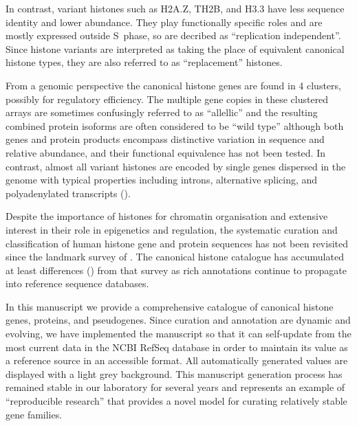   In contrast, variant histones such as H2A.Z, TH2B, and H3.3 have
  less sequence identity and lower abundance.
  They play functionally specific roles and are mostly expressed outside S~phase,
  so are decribed as ``replication independent''.
  Since histone variants are interpreted as taking the place of equivalent canonical histone types,
  they are also referred to as ``replacement'' histones.

  From a genomic perspective the canonical histone genes are found in 4 clusters,
  possibly for regulatory efficiency.
  The multiple gene copies in these clustered arrays are sometimes confusingly referred to as ``allellic''
  and the resulting combined protein isoforms are often considered to be ``wild type''
  although both genes and protein products encompass distinctive variation in sequence and relative abundance,
  and their functional equivalence has not been tested.
  In contrast, almost all variant histones are encoded by single genes dispersed in the genome
  with typical properties including introns, alternative splicing,
  and polyadenylated transcripts ().

  Despite the importance of histones for chromatin organisation and extensive interest
  in their role in epigenetics and regulation, the systematic curation and classification of human histone
  gene and protein sequences has not been revisited
  since the landmark survey of \citet{Marzluff02}.
  The canonical histone catalogue has accumulated at least
   differences ()
  from that survey as rich annotations continue to propagate into reference sequence databases.

  In this manuscript we provide a comprehensive catalogue
  of canonical histone genes, proteins, and pseudogenes.
  Since curation and annotation are dynamic and evolving,
  we have implemented the manuscript so that it can
  self-update from the most current data in the NCBI RefSeq database
  in order to maintain its value as a reference source in an accessible format.
  All automatically generated values are displayed with a light grey background.
  This manuscript generation process has remained stable in our laboratory for several years
  and represents an example of ``reproducible research'' \citep{Claerbout2000}
  that provides a novel model for curating relatively stable gene families.

